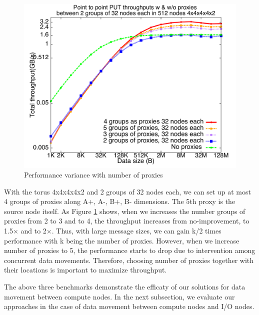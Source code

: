 \documentclass[final,5p,times]{elsarticle}
\begin{document}
\begin{figure}[!htb]
\vspace{-0.1in}
\centering
\includegraphics[scale=0.3]{figures/num_groxies}
\vspace{-0.2in}
\caption{Performance variance with number of proxies}
\label{fig:num_groxies}
\vspace{-0.1in}
\end{figure}

With the torus 4x4x4x4x2 and 2 groups of 32 nodes each, we can set up at most 4 groups of proxies along A+, A-, B+, B- dimensions. The 5th proxy is the source node itself. As Figure \ref{fig:num_groxies} shows, when we increases the number groups of proxies from 2 to 3 and to 4, the throughput increases from no-improvement, to 1.5$\times$ and to 2$\times$. Thus, with large message sizes, we can gain k/2 times performance with k being the number of proxies. However, when we increase number of proxies to 5, the performance starts to drop due to intervention among concurrent data movements. Therefore, choosing number of proxies together with their locations is important to maximize throughput.

The above three benchmarks demonstrate the efficaty of our solutions for data movement between compute nodes. In the next subsection, we evaluate our approaches in the case of data movement between compute nodes and I/O nodes. 

\end{document}
